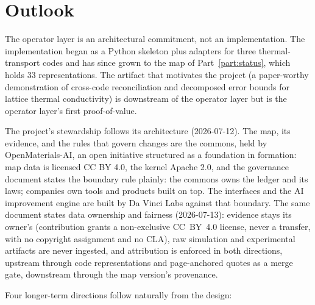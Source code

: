 \documentclass[11pt,a4paper]{article}
\begin{document}
\section{Outlook}
\label{sec:outlook}

The operator layer is an architectural commitment, not an implementation. The implementation
began as a Python skeleton plus adapters for three thermal-transport codes and has since grown
to the map of Part~\ref{part:status}, which holds 33 representations. The
artifact that motivates the project (a paper-worthy demonstration of cross-code reconciliation
and decomposed error bounds for lattice thermal conductivity) is downstream of the operator layer but
is the operator layer's first proof-of-value.

The project's stewardship follows its architecture (2026-07-12). The map, its
evidence, and the rules that govern changes are the commons, held by
OpenMaterials-AI, an open initiative structured as a foundation in formation:
map data is licensed CC BY 4.0, the kernel Apache 2.0, and the governance
document states the boundary rule plainly: the commons owns the ledger and its
laws; companies own tools and products built on top. The interfaces and the AI
improvement engine are built by Da Vinci Labs against that boundary. The same
document states data ownership and fairness (2026-07-13): evidence stays its
owner's (contribution grants a non-exclusive CC~BY~4.0 license, never a
transfer, with no copyright assignment and no CLA), raw simulation and
experimental artifacts are never ingested, and attribution is enforced in both
directions, upstream through code representations and page-anchored quotes as a merge
gate, downstream through the map version's provenance.

Four longer-term directions follow naturally from the design:
\end{document}
